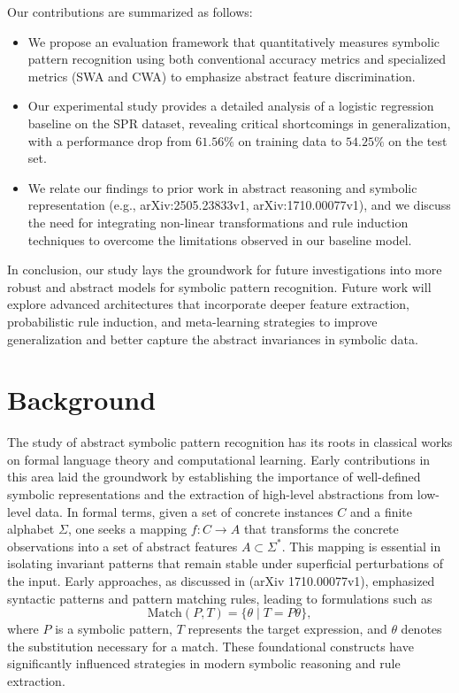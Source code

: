 \documentclass{article}
\begin{document}
Our contributions are summarized as follows:
\begin{itemize}
    \item We propose an evaluation framework that quantitatively measures symbolic pattern recognition using both conventional accuracy metrics and specialized metrics (SWA and CWA) to emphasize abstract feature discrimination.
    \item Our experimental study provides a detailed analysis of a logistic regression baseline on the SPR dataset, revealing critical shortcomings in generalization, with a performance drop from \(61.56\%\) on training data to \(54.25\%\) on the test set.
    \item We relate our findings to prior work in abstract reasoning and symbolic representation (e.g., arXiv:2505.23833v1, arXiv:1710.00077v1), and we discuss the need for integrating non-linear transformations and rule induction techniques to overcome the limitations observed in our baseline model.
\end{itemize}
In conclusion, our study lays the groundwork for future investigations into more robust and abstract models for symbolic pattern recognition. Future work will explore advanced architectures that incorporate deeper feature extraction, probabilistic rule induction, and meta-learning strategies to improve generalization and better capture the abstract invariances in symbolic data.

\section{Background}
The study of abstract symbolic pattern recognition has its roots in classical works on formal language theory and computational learning. Early contributions in this area laid the groundwork by establishing the importance of well-defined symbolic representations and the extraction of high-level abstractions from low-level data. In formal terms, given a set of concrete instances \( C \) and a finite alphabet \( \Sigma \), one seeks a mapping \( f: C \rightarrow A \) that transforms the concrete observations into a set of abstract features \( A \subset \Sigma^{*} \). This mapping is essential in isolating invariant patterns that remain stable under superficial perturbations of the input. Early approaches, as discussed in (arXiv 1710.00077v1), emphasized syntactic patterns and pattern matching rules, leading to formulations such as 
\[
\text{Match}(P, T) = \{ \theta \mid T = P\theta \},
\]
where \( P \) is a symbolic pattern, \( T \) represents the target expression, and \( \theta \) denotes the substitution necessary for a match. These foundational constructs have significantly influenced strategies in modern symbolic reasoning and rule extraction.
\end{document}
